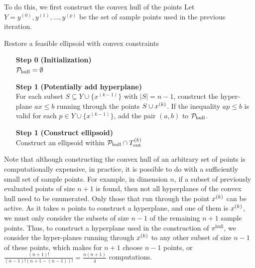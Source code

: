 

To do this, we first construct the convex hull of the points 
Let $Y = y^{(0)}, y^{(1)}, \ldots, y^{(p)}$ be the set of sample points used in the previous iteration.

\begin{algorithm}[H]
    \caption{Restore a feasible ellipsoid with convex constraints}
    \label{restore_feasible_ellipsoid_convex}
    \begin{itemize}
        \item[\textbf{Step 0}] \textbf{(Initialization)} \\
            $\mathcal P_{\textrm{hull}} = \emptyset$
            
        \item[\textbf{Step 1}] \textbf{(Potentially add hyperplane)} \\
	    For each subset $S \subseteq Y \cup \{x^{(k-1)}\}$ with $|S| = n - 1$, construct the hyper-plane $ax\le b$ running through the points $S \cup x^{(k)}$.
	    If the inequality $ap \le b$ is valid for each $p \in Y \cup \{x^{(k-1)}\}$, add the pair $(a, b)$ to $\mathcal P_{\textrm{hull}}$.
	
	\item[\textbf{Step 1}] \textbf{(Construct ellipsoid)} \\
	   Construct an ellipsoid within $\mathcal P_{\textrm{hull}} \cap {T_{\text{out}}^{(k)}}$ \\
    \end{itemize}
\end{algorithm}



Note that although constructing the convex hull of an arbitrary set of points is computationally expensive,
in practice, it is possible to do with a sufficiently small set of sample points.
For example, in dimension $n$, if a subset of previously evaluated points of size $n+1$ is found, then not all hyperplanes of the convex hull need to be enumerated.
Only those that run through the point $x^{(k)}$ can be active.
As it takes $n$ points to construct a hyperplane, and one of them is $x^{(k)}$, we must only consider the subsets of size $n-1$ of the remaining $n+1$ sample points.
Thus, to construct a hyperplane used in the construction of $\pi^{\textrm{hull}}$,
we consider the hyper-planes running through $x^{(k)}$ to any other subset of size $n - 1$ of these points,
which makes for $n+1$ choose $n-1$ points, or
$
\frac{(n+1)!}{(n-1)!(n+1 - (n-1))!} = \frac{n(n+1) }{4}
$
computations.


